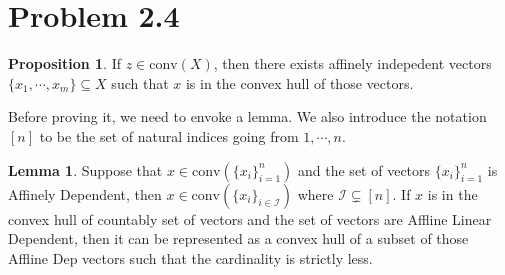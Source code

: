 \documentclass[]{article}
\theoremstyle{definition}
\newtheorem{prop}{Proposition}
\newtheorem{lemma}{Lemma}
\begin{document}
\section*{Problem 2.4}
    \begin{prop}
        If $z\in \text{conv}(X)$, then there exists affinely indepedent vectors $\{x_1, \cdots, x_m\}\subseteq X$ such that $x$ is in the convex hull of those vectors. 
    \end{prop}
    \par
    Before proving it, we need to envoke a lemma. We also introduce the notation $[n]$ to be the set of natural indices going from $1, \cdots, n$. 
    \begin{lemma}
        Suppose that $x\in \text{conv}(\{x_i\}_{i = 1}^n)$ and the set of vectors $\{x_i\}_{i = 1}^n$ is Affinely Dependent, then $x\in \text{conv}(\{x_i\}_{i \in \mathcal I})$ where $\mathcal I \subsetneq[n]$. If $x$ is in the convex hull of countably set of vectors and the set of vectors are Affline Linear Dependent, then it can be represented as a convex hull of a subset of those Affline Dep vectors such that the cardinality is strictly less. 
    \end{lemma}
\end{document}
